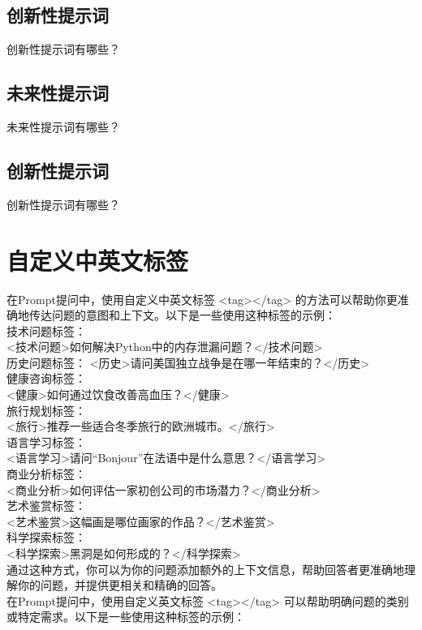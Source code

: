 \documentclass[12pt]{book}
\begin{document}
\section{创新性提示词}
创新性提示词有哪些？

\section{未来性提示词}
未来性提示词有哪些？

\section{创新性提示词}
创新性提示词有哪些？


\chapter{自定义中英文标签}
在Prompt提问中，使用自定义中英文标签 <tag></tag> 的方法可以帮助你更准确地传达问题的意图和上下文。以下是一些使用这种标签的示例：\\

技术问题标签：\\
<技术问题>如何解决Python中的内存泄漏问题？</技术问题>\\
历史问题标签：
<历史>请问美国独立战争是在哪一年结束的？</历史>\\
健康咨询标签：\\
<健康>如何通过饮食改善高血压？</健康>\\
旅行规划标签：\\
<旅行>推荐一些适合冬季旅行的欧洲城市。</旅行>\\
语言学习标签：\\
<语言学习>请问“Bonjour”在法语中是什么意思？</语言学习>\\
商业分析标签：\\
<商业分析>如何评估一家初创公司的市场潜力？</商业分析>\\
艺术鉴赏标签：\\
<艺术鉴赏>这幅画是哪位画家的作品？</艺术鉴赏>\\
科学探索标签：\\
<科学探索>黑洞是如何形成的？</科学探索>\\
通过这种方式，你可以为你的问题添加额外的上下文信息，帮助回答者更准确地理解你的问题，并提供更相关和精确的回答。\\


在Prompt提问中，使用自定义英文标签 <tag></tag> 可以帮助明确问题的类别或特定需求。以下是一些使用这种标签的示例：\\
\end{document}
